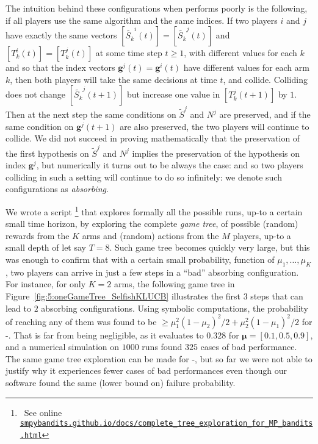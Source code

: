 The intuition behind these configurations when \Selfish{} performs poorly is the following,
if all players use the same algorithm and the same indices.
If two players $i$ and $j$ have exactly the same vectors $[\widetilde{S_k}^i(t)] = [\widetilde{S_k}^j(t)]$
and $[T_k^i(t)] = [T_k^j(t)]$ at some time step $t \geq 1$,
with different values for each $k$
and so that the index vectors $\mathbf{g}^j(t) = \mathbf{g}^{i}(t)$ have different values for each arm $k$,
then both players will take the same decisions at time $t$, and collide.
Colliding does not change $[\widetilde{S_k}^j(t+1)]$ but increase one value in $[T_k^j(t+1)]$ by $1$.
Then at the next step the same conditions on $\widetilde{S}^j$ and $N^j$ are preserved,
and if the same condition on $\mathbf{g}^j(t+1)$ are also preserved,
the two players will continue to collide.
%
We did not succeed in proving mathematically
that the preservation of the first hypothesis on $\widetilde{S}^j$ and $N^j$
implies the preservation of the hypothesis on index $\mathbf{g}^j$,
but numerically it turns out to be always the case:
and so two players colliding in such a setting will continue to do so infinitely:
we denote such configurations as \emph{absorbing}.

We wrote a script
\footnote{~See online \texttt{\url{smpybandits.github.io/docs/complete_tree_exploration_for_MP_bandits.html}}}
that explores formally all the possible runs,
up-to a certain small time horizon,
by exploring the complete \emph{game tree},
of possible (random) rewards from the $K$ arms
and (random) actions from the $M$ players, up-to a small depth of let say $T=8$.
%
Such game tree becomes quickly very large, but this was enough to confirm that with
a certain small probability, function of $\mu_1,\dots,\mu_K$,
two players can arrive in just a few steps in a ``bad'' absorbing configuration.
%
For instance, for only $K=2$ arms, the following game tree in Figure~\ref{fig:5:oneGameTree_SelfishKLUCB} illustrates the first $3$ steps that can lead to $2$ absorbing configurations.
Using symbolic computations, the probability of reaching any of them was found to be
$\geq \mu_1^2(1-\mu_2)^2/2 + \mu_2^2(1-\mu_1)^2/2$ for \Selfish-\UCB.
That is far from being negligible, as it evaluates to $0.328$ for $\boldsymbol{\mu} = [0.1, 0.5, 0.9]$,
and a numerical simulation on $1000$ runs found $325$ cases of bad performance.
%
The same game tree exploration can be made for \Selfish-\klUCB,
but so far we were not able to justify why it experiences fewer cases of bad performances even though our software found the same (lower bound on) failure probability.


